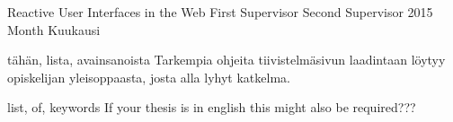 \usepackage{float}



\newcommand{\ab}[1]{\textsc{#1}}

\newcommand{\num}[1]{#1}

%
%


{}\finfalse

    {Reactive User Interfaces in the Web}
    {First Supervisor}
    {Second Supervisor}
    {2015}
    {Month}
    {Kuukausi} 
    


\gentitle

\begin{ittiivis}{tähän, lista, avainsanoista}
Tarkempia ohjeita tiivistelmäsivun laadintaan löytyy opiskelijan
yleisoppaasta, josta alla lyhyt katkelma.
\end{ittiivis}

\begin{itabstract}{list, of, keywords}
If your thesis is in english this might also be required???
\end{itabstract}


